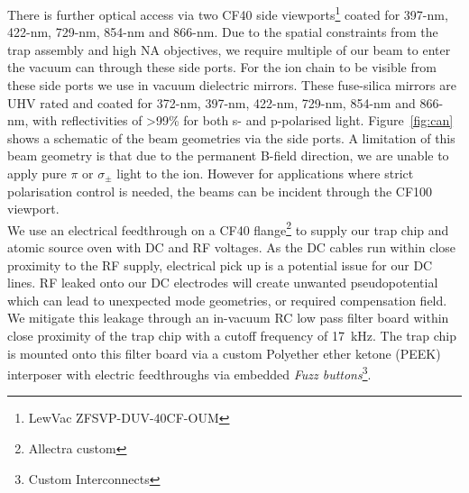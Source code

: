     There is further optical access via
    two CF40 side viewports\footnote{LewVac ZFSVP-DUV-40CF-OUM} coated
    for 397-nm, 422-nm, 729-nm, 854-nm and 866-nm.  Due to the spatial
    constraints from the trap assembly and high NA objectives, we require
    multiple of our beam to enter the vacuum can through these side ports. For the ion chain to be visible from these side ports we use in vacuum dielectric
    mirrors. These fuse-silica mirrors are UHV rated and coated for 372-nm, 397-nm,
    422-nm, 729-nm, 854-nm and 866-nm, with reflectivities of >99\% for both s-
    and p-polarised light. Figure~\ref{fig:can} shows a schematic of the beam
    geometries via the side ports. A limitation of this beam geometry is that due to the permanent B-field direction, we are unable to apply pure $\pi$ or $\sigma_{\pm}$ light to the ion. However for applications where strict polarisation control is needed, the beams can be incident through the CF100 viewport.\\
    We use an electrical feedthrough on a CF40 flange\footnote{Allectra custom}
    to supply our trap chip and atomic source oven with DC and RF voltages. As
    the DC cables run within close proximity to the RF supply, electrical pick
    up is a potential issue for our DC lines. RF leaked onto our DC electrodes
    will create unwanted pseudopotential which can lead to unexpected mode
    geometries, or required compensation field. We mitigate this leakage through
    an in-vacuum RC low pass filter board within close proximity of the trap
    chip with a cutoff frequency of 17~kHz. The trap chip is mounted onto this
    filter board via a custom Polyether ether ketone (PEEK) interposer with
    electric feedthroughs via embedded \emph{Fuzz buttons}\footnote{Custom
    Interconnects}. \\

